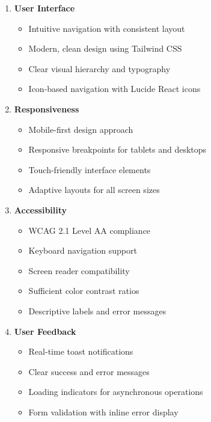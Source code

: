 \begin{enumerate}[leftmargin=*]
    \item \textbf{User Interface}
    \begin{itemize}
        \item Intuitive navigation with consistent layout
        \item Modern, clean design using Tailwind CSS
        \item Clear visual hierarchy and typography
        \item Icon-based navigation with Lucide React icons
    \end{itemize}
    
    \item \textbf{Responsiveness}
    \begin{itemize}
        \item Mobile-first design approach
        \item Responsive breakpoints for tablets and desktops
        \item Touch-friendly interface elements
        \item Adaptive layouts for all screen sizes
    \end{itemize}
    
    \item \textbf{Accessibility}
    \begin{itemize}
        \item WCAG 2.1 Level AA compliance
        \item Keyboard navigation support
        \item Screen reader compatibility
        \item Sufficient color contrast ratios
        \item Descriptive labels and error messages
    \end{itemize}
    
    \item \textbf{User Feedback}
    \begin{itemize}
        \item Real-time toast notifications
        \item Clear success and error messages
        \item Loading indicators for asynchronous operations
        \item Form validation with inline error display
    \end{itemize}
\end{enumerate}

